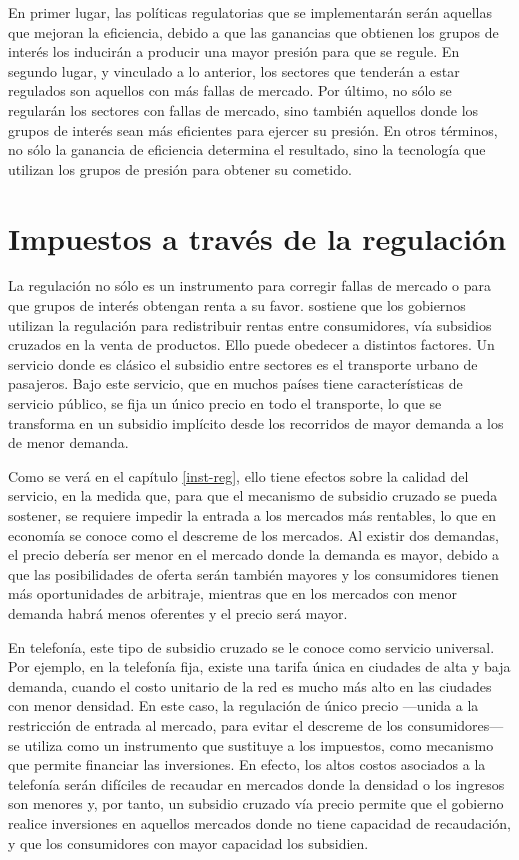 \documentclass[
  12pt,
  spanish,
]{book}
\begin{document}
En primer lugar, las políticas regulatorias que se implementarán serán aquellas que mejoran la eficiencia, debido a que las ganancias que obtienen los grupos de interés los inducirán a producir una mayor presión para que se regule. En segundo lugar, y vinculado a lo anterior, los sectores que tenderán a estar regulados son aquellos con más fallas de mercado. Por último, no sólo se regularán los sectores con fallas de mercado, sino también aquellos donde los grupos de interés sean más eficientes para ejercer su presión. En otros términos, no sólo la ganancia de eficiencia determina el resultado, sino la tecnología que utilizan los grupos de presión para obtener su cometido.

\hypertarget{impuestos-a-travuxe9s-de-la-regulaciuxf3n}{%
\section{Impuestos a través de la regulación}\label{impuestos-a-travuxe9s-de-la-regulaciuxf3n}}

La regulación no sólo es un instrumento para corregir fallas de mercado o para que grupos de interés obtengan renta a su favor. \citet{Posner1971} sostiene que los gobiernos utilizan la regulación para redistribuir rentas entre consumidores, vía subsidios cruzados en la venta de productos. Ello puede obedecer a distintos factores. Un servicio donde es clásico el subsidio entre sectores es el transporte urbano de pasajeros. Bajo este servicio, que en muchos países tiene características de servicio público, se fija un único precio en todo el transporte, lo que se transforma en un subsidio implícito desde los recorridos de mayor demanda a los de menor demanda.

Como se verá en el capítulo \ref{inst-reg}, ello tiene efectos sobre la calidad del servicio, en la medida que, para que el mecanismo de subsidio cruzado se pueda sostener, se requiere impedir la entrada a los mercados más rentables, lo que en economía se conoce como el descreme de los mercados. Al existir dos demandas, el precio debería ser menor en el mercado donde la demanda es mayor, debido a que las posibilidades de oferta serán también mayores y los consumidores tienen más oportunidades de arbitraje, mientras que en los mercados con menor demanda habrá menos oferentes y el precio será mayor.

En telefonía, este tipo de subsidio cruzado se le conoce como servicio universal. Por ejemplo, en la telefonía fija, existe una tarifa única en ciudades de alta y baja demanda, cuando el costo unitario de la red es mucho más alto en las ciudades con menor densidad. En este caso, la regulación de único precio ---unida a la restricción de entrada al mercado, para evitar el descreme de los consumidores--- se utiliza como un instrumento que sustituye a los impuestos, como mecanismo que permite financiar las inversiones. En efecto, los altos costos asociados a la telefonía serán difíciles de recaudar en mercados donde la densidad o los ingresos son menores y, por tanto, un subsidio cruzado vía precio permite que el gobierno realice inversiones en aquellos mercados donde no tiene capacidad de recaudación, y que los consumidores con mayor capacidad los subsidien.
\end{document}
